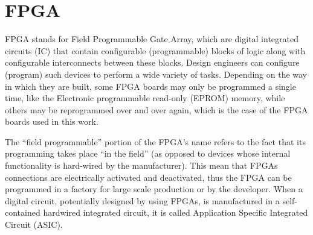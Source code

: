 %
%
%

\section{FPGA}

FPGA stands for Field Programmable Gate Array, which are digital integrated
circuits (IC) that contain configurable (programmable) blocks of logic along
with configurable interconnects between these blocks. Design engineers can
configure (program) such devices to perform a wide variety of tasks. Depending
on the way in which they are built, some FPGA boards may only be programmed a
single time, like the Electronic programmable read-only (EPROM) memory, while
others may be reprogrammed over and over again, which is the case of the FPGA
boards used in this work.\cite{max2004}

The “field programmable” portion of the FPGA’s name refers to the fact that its
programming takes place “in the field” (as opposed to devices whose internal
functionality is hard-wired by the manufacturer). This mean that FPGAs
connections are electrically activated and deactivated, thus the FPGA can be
programmed in a factory for large scale production or by the developer. When a
digital circuit, potentially designed by using FPGAs, is manufactured in a
self-contained hardwired integrated circuit, it is called Application Specific
Integrated Circuit (ASIC).


